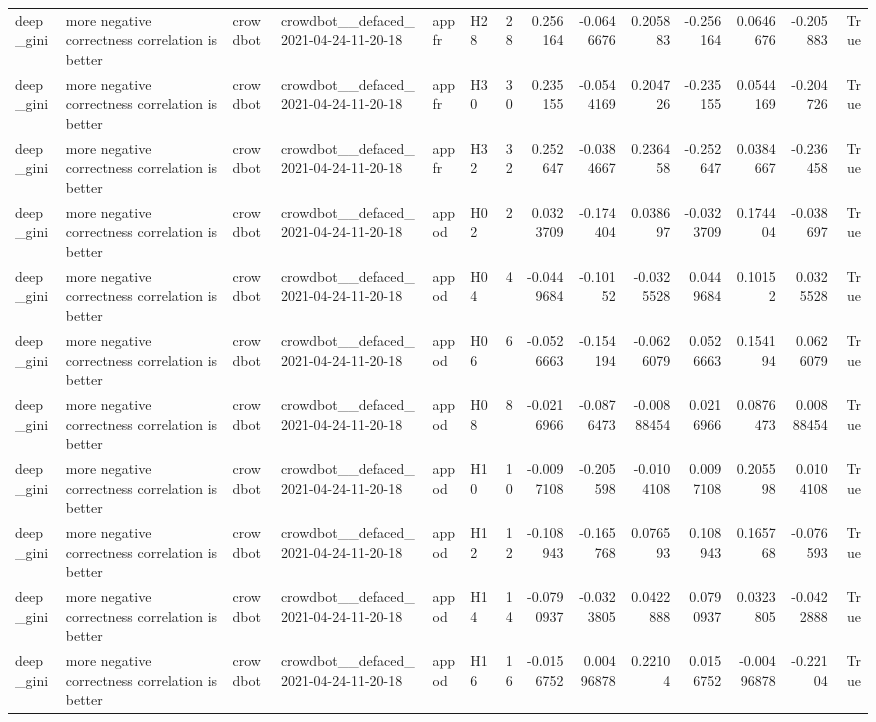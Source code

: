 \begin{longtable}{llllllrrrrrrrr}
deep\_gini & more negative correctness correlation is better & crowdbot & crowdbot\_\_defaced\_2021-04-24-11-20-18 & appfr & H28 & 28 & 0.256164 & -0.0646676 & 0.205883 & -0.256164 & 0.0646676 & -0.205883 & True \\
deep\_gini & more negative correctness correlation is better & crowdbot & crowdbot\_\_defaced\_2021-04-24-11-20-18 & appfr & H30 & 30 & 0.235155 & -0.0544169 & 0.204726 & -0.235155 & 0.0544169 & -0.204726 & True \\
deep\_gini & more negative correctness correlation is better & crowdbot & crowdbot\_\_defaced\_2021-04-24-11-20-18 & appfr & H32 & 32 & 0.252647 & -0.0384667 & 0.236458 & -0.252647 & 0.0384667 & -0.236458 & True \\
deep\_gini & more negative correctness correlation is better & crowdbot & crowdbot\_\_defaced\_2021-04-24-11-20-18 & appod & H02 & 2 & 0.0323709 & -0.174404 & 0.038697 & -0.0323709 & 0.174404 & -0.038697 & True \\
deep\_gini & more negative correctness correlation is better & crowdbot & crowdbot\_\_defaced\_2021-04-24-11-20-18 & appod & H04 & 4 & -0.0449684 & -0.10152 & -0.0325528 & 0.0449684 & 0.10152 & 0.0325528 & True \\
deep\_gini & more negative correctness correlation is better & crowdbot & crowdbot\_\_defaced\_2021-04-24-11-20-18 & appod & H06 & 6 & -0.0526663 & -0.154194 & -0.0626079 & 0.0526663 & 0.154194 & 0.0626079 & True \\
deep\_gini & more negative correctness correlation is better & crowdbot & crowdbot\_\_defaced\_2021-04-24-11-20-18 & appod & H08 & 8 & -0.0216966 & -0.0876473 & -0.00888454 & 0.0216966 & 0.0876473 & 0.00888454 & True \\
deep\_gini & more negative correctness correlation is better & crowdbot & crowdbot\_\_defaced\_2021-04-24-11-20-18 & appod & H10 & 10 & -0.0097108 & -0.205598 & -0.0104108 & 0.0097108 & 0.205598 & 0.0104108 & True \\
deep\_gini & more negative correctness correlation is better & crowdbot & crowdbot\_\_defaced\_2021-04-24-11-20-18 & appod & H12 & 12 & -0.108943 & -0.165768 & 0.076593 & 0.108943 & 0.165768 & -0.076593 & True \\
deep\_gini & more negative correctness correlation is better & crowdbot & crowdbot\_\_defaced\_2021-04-24-11-20-18 & appod & H14 & 14 & -0.0790937 & -0.0323805 & 0.0422888 & 0.0790937 & 0.0323805 & -0.0422888 & True \\
deep\_gini & more negative correctness correlation is better & crowdbot & crowdbot\_\_defaced\_2021-04-24-11-20-18 & appod & H16 & 16 & -0.0156752 & 0.00496878 & 0.22104 & 0.0156752 & -0.00496878 & -0.22104 & True \\

\end{longtable}
